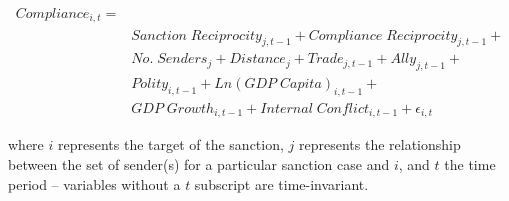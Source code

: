 \begin{align*}
		Compliance_{i,t} =& \\
		&Sanction \; Reciprocity_{j,t-1} + Compliance \; Reciprocity_{j,t-1} + \\
		&No. \; Senders_{j} + Distance_{j} + Trade_{j,t-1} + Ally_{j,t-1} + \\
		&Polity_{i,t-1} + Ln(GDP \; Capita)_{i,t-1} +\\
		&GDP \; Growth_{i,t-1} + Internal \; Conflict_{i,t-1} + \epsilon_{i,t}
\end{align*}

where $i$ represents the target of the sanction, $j$ represents the relationship between the set of sender(s) for a particular sanction case and $i$, and $t$ the time period -- variables without a $t$ subscript are time-invariant.

